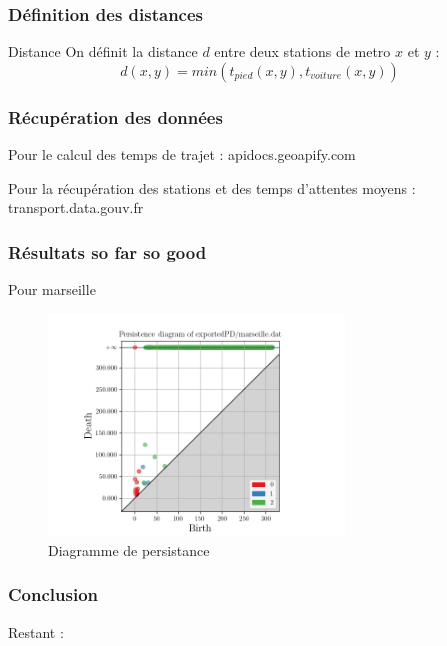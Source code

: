 \documentclass{beamer}
\begin{document}
\begin{frame}
    \frametitle{Définition des distances}
    
    \begin{block}{Distance}
        On définit la distance $d$ entre deux stations de metro $x$ et $y$ : 
        $$ d(x,y) =  min(t_{pied}(x,y), t_{voiture}(x,y))$$
    \end{block}
\end{frame}

\begin{frame}
    \frametitle{Récupération des données}
    Pour le calcul des temps de trajet :  apidocs.geoapify.com

    Pour la récupération des stations et des temps d'attentes moyens : transport.data.gouv.fr
\end{frame}

\begin{frame}
    \frametitle{Résultats so far so good}
    Pour marseille 
    \begin{figure}
        \includegraphics[width=0.7\textwidth]{pd_marseille}
        \centering
        \caption{Diagramme de persistance}
    \end{figure}
\end{frame}

\begin{frame}
    \frametitle{Conclusion}
    Restant :
    
\end{frame}
\end{document}

